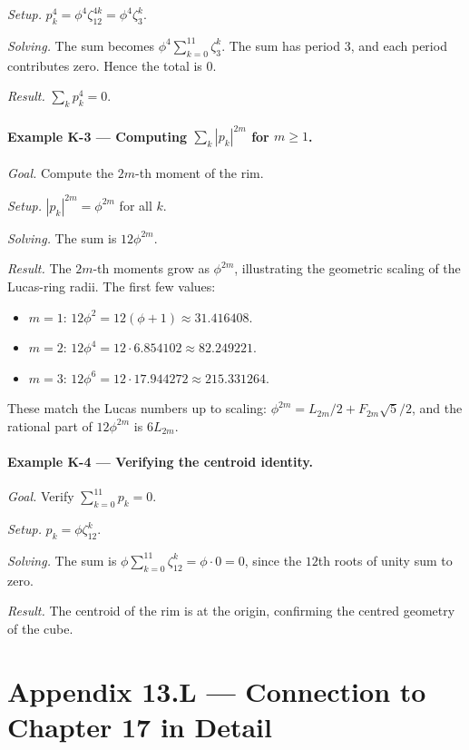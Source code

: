 \emph{Setup.} $p_{k}^{4} = \phi^{4} \zeta_{12}^{4k} = \phi^{4}
\zeta_{3}^{k}$.

\emph{Solving.} The sum becomes
$\phi^{4} \sum_{k=0}^{11} \zeta_{3}^{k}$. The sum has period $3$,
and each period contributes zero. Hence the total is $0$.

\emph{Result.} $\sum_{k} p_{k}^{4} = 0$.

\paragraph{Example K-3 --- Computing $\sum_{k} |p_{k}|^{2 m}$
for $m \geq 1$.}
\emph{Goal.} Compute the $2m$-th moment of the rim.

\emph{Setup.} $|p_{k}|^{2m} = \phi^{2m}$ for all $k$.

\emph{Solving.} The sum is $12 \phi^{2m}$.

\emph{Result.} The $2m$-th moments grow as $\phi^{2m}$, illustrating
the geometric scaling of the Lucas-ring radii. The first few
values:
\begin{itemize}
\item $m = 1$: $12 \phi^{2} = 12(\phi + 1) \approx 31.416408$.
\item $m = 2$: $12 \phi^{4} = 12 \cdot 6.854102 \approx 82.249221$.
\item $m = 3$: $12 \phi^{6} = 12 \cdot 17.944272 \approx 215.331264$.
\end{itemize}
These match the Lucas numbers up to scaling: $\phi^{2m} =
L_{2m}/2 + F_{2m}\sqrt{5}/2$, and the rational part of $12 \phi^{2m}$
is $6 L_{2m}$.

\paragraph{Example K-4 --- Verifying the centroid identity.}
\emph{Goal.} Verify $\sum_{k=0}^{11} p_{k} = 0$.

\emph{Setup.} $p_{k} = \phi \zeta_{12}^{k}$.

\emph{Solving.} The sum is $\phi \sum_{k=0}^{11} \zeta_{12}^{k} =
\phi \cdot 0 = 0$, since the $12$th roots of unity sum to zero.

\emph{Result.} The centroid of the rim is at the origin, confirming
the centred geometry of the cube.

\section*{Appendix 13.L --- Connection to Chapter 17 in Detail}
\label{sec:13-appL}

